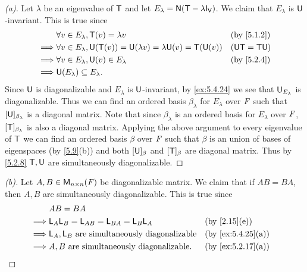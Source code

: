 \begin{proof}[(a)]
  Let \(\lambda\) be an eigenvalue of \(\mathsf{T}\) and let \(E_{\lambda} = \ns{\T - \lambda \IT[\V]}\).
  We claim that \(E_{\lambda}\) is \(\mathsf{U}\)-invariant.
  This is true since
  \begin{align*}
             & \forall v \in E_{\lambda}, \T(v) = \lambda v                                     &  & \text{(by \cref{5.1.2})} \\
    \implies & \forall v \in E_{\lambda}, \U(\T(v)) = \U(\lambda v) = \lambda \U(v) = \T(\U(v)) &  & (\U \T = \T \U)          \\
    \implies & \forall v \in E_{\lambda}, \U(v) \in E_{\lambda}                                 &  & \text{(by \cref{5.2.4})} \\
    \implies & \U(E_{\lambda}) \subseteq E_{\lambda}.
  \end{align*}
  Since \(\mathsf{U}\) is diagonalizable and \(E_{\lambda}\) is \(\mathsf{U}\)-invariant, by \cref{ex:5.4.24} we see that \(\mathsf{U}_{E_{\lambda}}\) is diagonalizable.
  Thus we can find an ordered basis \(\beta_{\lambda}\) for \(E_{\lambda}\) over \(\mathit{F}\) such that \([\mathsf{U}]_{\beta_{\lambda}}\) is a diagonal matrix.
  Note that since \(\beta_{\lambda}\) is an ordered basis for \(E_{\lambda}\) over \(\mathit{F}\), \([\mathsf{T}]_{\beta_{\lambda}}\) is also a diagonal matrix.
  Applying the above argument to every eigenvalue of \(\mathsf{T}\) we can find an ordered basis \(\beta\) over \(\mathit{F}\) such that \(\beta\) is an union of bases of eigenspaces (by \cref{5.9}(b)) and both \([\mathsf{U}]_{\beta}\) and \([\mathsf{T}]_{\beta}\) are diagonal matrix.
  Thus by \cref{5.2.8} \(\mathsf{T}, \mathsf{U}\) are simultaneously diagonalizable.
\end{proof}

\begin{proof}[(b)]
  Let \(A, B \in \mathsf{M}_{{n} \times n}({\mathit{F}})\) be diagonalizable matrix.
  We claim that if \(AB = BA\), then \(A, B\) are simultaneously diagonalizable.
  This is true since
  \begin{align*}
             & AB = BA                                                                                   \\
    \implies & \L_A \L_B = \L_{AB} = \L_{BA} = \L_B \L_A            &  & \text{(by \cref{2.15}(e))}      \\
    \implies & \L_A, \L_B \text{ are simultaneously diagonalizable} &  & \text{(by \cref{ex:5.4.25}(a))} \\
    \implies & A, B \text{ are simultaneously diagonalizable}.      &  & \text{(by \cref{ex:5.2.17}(a))}
  \end{align*}
\end{proof}

